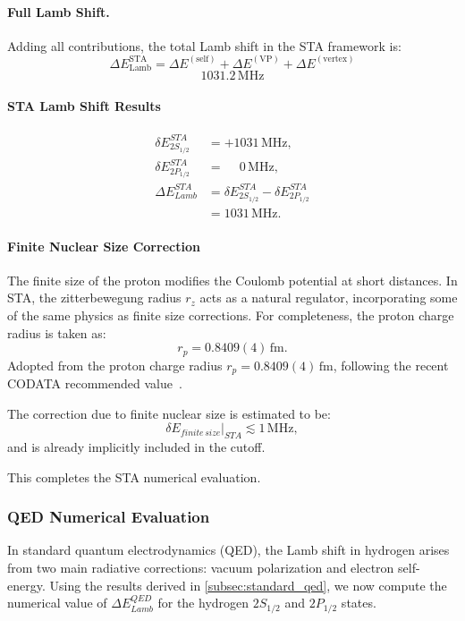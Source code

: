 \documentclass[12pt]{article}
\begin{document}
\paragraph{Full Lamb Shift.}  
Adding all contributions, the total Lamb shift in the STA framework is:
\[
\Delta E_{\mathrm{Lamb}}^{\mathrm{STA}} = \Delta E^{\mathrm{(self)}} + \Delta E^{\mathrm{(VP)}} + \Delta E^{\mathrm{(vertex)}}
\]
\[
\boxed{1031.2\,\mathrm{MHz}}
\]

\paragraph{STA Lamb Shift Results}
\[
\begin{aligned}
\delta E_{2S_{1/2}}^{STA} &= +1031\,\mathrm{MHz},\\
\delta E_{2P_{1/2}}^{STA} &= \phantom{+}0\,\mathrm{MHz},\\
\Delta E_{Lamb}^{STA} &= \delta E_{2S_{1/2}}^{STA}-\delta E_{2P_{1/2}}^{STA}\\
&= 1031\,\mathrm{MHz}.
\end{aligned}
\]

\paragraph{Finite Nuclear Size Correction}
The finite size of the proton modifies the Coulomb potential at short distances. In STA, the zitterbewegung radius \(r_z\) acts as a natural regulator, incorporating some of the same physics as finite size corrections. For completeness, the proton charge radius is taken as:
\[
r_p = 0.8409(4)\,\mathrm{fm}.
\]
Adopted from the proton charge radius $r_p = 0.8409(4)\,\mathrm{fm}$, following the recent CODATA recommended value~\cite{CODATA2018}.

The correction due to finite nuclear size is estimated to be:
\[
\delta E_{finite\,size}\big|_{STA} \lesssim 1\,\mathrm{MHz},
\]
and is already implicitly included in the cutoff.

This completes the STA numerical evaluation.

\subsubsection{QED Numerical Evaluation}\label{subsec:qed_numerical}

In standard quantum electrodynamics (QED), the Lamb shift in hydrogen arises from two main radiative corrections: vacuum polarization and electron self-energy. Using the results derived in \ref{subsec:standard_qed}, we now compute the numerical value of \(\Delta E_{Lamb}^{QED}\) for the hydrogen \(2S_{1/2}\) and \(2P_{1/2}\) states.
\end{document}
